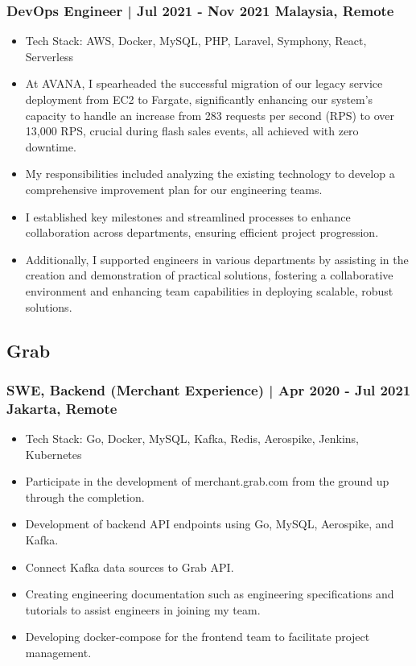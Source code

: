 \documentclass[11pt]{article}
\begin{document}
\subsubsection{DevOps Engineer | Jul 2021 - Nov 2021 \hfill Malaysia, Remote}
\begin{itemize}
    \item Tech Stack: AWS, Docker, MySQL, PHP, Laravel, Symphony, React, Serverless
    \item At AVANA, I spearheaded the successful migration of our legacy service deployment from EC2 to Fargate, significantly enhancing our system's capacity to handle an increase from 283 requests per second (RPS) to over 13,000 RPS, crucial during flash sales events, all achieved with zero downtime.
    \item My responsibilities included analyzing the existing technology to develop a comprehensive improvement plan for our engineering teams.
    \item I established key milestones and streamlined processes to enhance collaboration across departments, ensuring efficient project progression.
    \item Additionally, I supported engineers in various departments by assisting in the creation and demonstration of practical solutions, fostering a collaborative environment and enhancing team capabilities in deploying scalable, robust solutions.
\end{itemize}

\subsection{Grab}
\subsubsection{SWE, Backend (Merchant Experience) | Apr 2020 - Jul 2021 \hfill Jakarta, Remote}
\begin{itemize}
    \item Tech Stack: Go, Docker, MySQL, Kafka, Redis, Aerospike, Jenkins, Kubernetes
    \item Participate in the development of merchant.grab.com from the ground up through the completion.
    \item Development of backend API endpoints using Go, MySQL, Aerospike, and Kafka.
    \item Connect Kafka data sources to Grab API.
    \item Creating engineering documentation such as engineering specifications and tutorials to assist
          engineers in joining my team.
    \item Developing docker-compose for the frontend team to facilitate project management.
\end{itemize}
\end{document}
